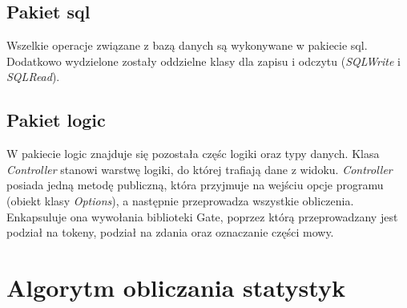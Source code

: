 \documentclass[11pt]{article}
\begin{document}
\subsection{Pakiet sql}
Wszelkie operacje związane z bazą danych są wykonywane w pakiecie sql.
Dodatkowo wydzielone zostały oddzielne klasy dla zapisu i odczytu (\emph{SQLWrite} i \emph{SQLRead}).

\subsection{Pakiet logic}
W pakiecie logic znajduje się pozostała częśc logiki oraz typy danych.
Klasa \emph{Controller} stanowi warstwę logiki, do której trafiają dane z widoku.
\emph{Controller} posiada jedną metodę publiczną, która przyjmuje na wejściu opcje programu (obiekt klasy \emph{Options}), a następnie przeprowadza wszystkie obliczenia.
Enkapsuluje ona wywołania biblioteki Gate, poprzez którą przeprowadzany jest podział na tokeny, podział na zdania oraz oznaczanie części mowy.

\section{Algorytm obliczania statystyk}
\end{document}
